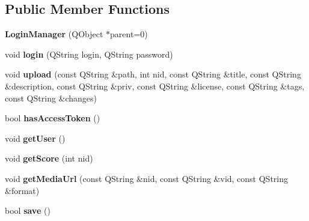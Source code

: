 \subsection*{Public Member Functions}
\begin{DoxyCompactItemize}
\item 
\mbox{\label{class_ms_1_1_login_manager_ad06f006e2a9fe1c6ac324af7dd0141ba}} 
{\bfseries Login\+Manager} (Q\+Object $\ast$parent=0)
\item 
\mbox{\label{class_ms_1_1_login_manager_a5c733ab290a57ab6cbd5001a61b2923e}} 
void {\bfseries login} (Q\+String login, Q\+String password)
\item 
\mbox{\label{class_ms_1_1_login_manager_a71f3dd037b991a93162dd3bad10d9606}} 
void {\bfseries upload} (const Q\+String \&path, int nid, const Q\+String \&title, const Q\+String \&description, const Q\+String \&priv, const Q\+String \&license, const Q\+String \&tags, const Q\+String \&changes)
\item 
\mbox{\label{class_ms_1_1_login_manager_a8498c88ecc8e30ed3f5ecbb3790707ad}} 
bool {\bfseries has\+Access\+Token} ()
\item 
\mbox{\label{class_ms_1_1_login_manager_ad9e8c59737947a92970bd351a26ba5b9}} 
void {\bfseries get\+User} ()
\item 
\mbox{\label{class_ms_1_1_login_manager_a3aa431bbccc26a5c5e2cd403f396f3bd}} 
void {\bfseries get\+Score} (int nid)
\item 
\mbox{\label{class_ms_1_1_login_manager_ae95e04b20b22d5f505d12f62bf5017af}} 
void {\bfseries get\+Media\+Url} (const Q\+String \&nid, const Q\+String \&vid, const Q\+String \&format)
\item 
\mbox{\label{class_ms_1_1_login_manager_a488aa3762528e737e9d4fda3e14e9f05}} 
bool {\bfseries save} ()
\item 
\mbox{\label{class_ms_1_1_login_manager_ad5b2b822345d371f2eaf56b9e255b6d7}} 

\end{DoxyCompactItemize}
